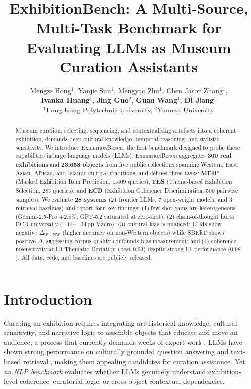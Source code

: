 \documentclass[11pt]{article}
\title{ExhibitionBench: A Multi-Source, Multi-Task Benchmark for\\
Evaluating LLMs as Museum Curation Assistants}
\author{Mengze Hong$^{1}$, Yanjie Sun$^{1}$, Mengyao Zhu$^{1}$, Chen Jason Zhang$^{1}$, \\ \textbf{Ivanka Huang}$^{1}$, \textbf{Jing Guo}$^{2}$, \textbf{Guan Wang}$^{1}$, \textbf{Di Jiang}$^{1}$\\ 
$^{1}$Hong Kong Polytechnic University, $^{2}$Yunnan University\\
}
\newcommand{\bench}{\textsc{ExhibitionBench}}
\newcommand{\meip}{\textsc{MEIP}}
\newcommand{\tes}{\textsc{TES}}
\newcommand{\ecd}{\textsc{ECD}}
\begin{document}
\maketitle

\begin{abstract}
Museum curation, selecting, sequencing, and contextualising artefacts
into a coherent exhibition, demands deep cultural knowledge, temporal
reasoning, and stylistic sensitivity.
We introduce \bench{}, the first benchmark designed to probe these
capabilities in large language models (LLMs).
\bench{} aggregates \textbf{300 real exhibitions} and \textbf{23{,}658 objects}
from five public collections spanning Western, East Asian, African,
and Islamic cultural traditions, and defines three tasks:
\textbf{\meip{}} (Masked Exhibition Item Prediction, 1{,}409 queries),
\textbf{\tes{}} (Theme-based Exhibition Selection, 283 queries),
and \textbf{\ecd{}} (Exhibition Coherence Discrimination, 500 pairwise samples).
We evaluate \textbf{28 systems} (21 frontier LLMs, 7 open-weight models, and 3 retrieval baselines) and report four key findings:
(1) few-shot gains are heterogeneous (Gemini-2.5-Pro $+2.5\%$; GPT-5.2 saturated at zero-shot);
(2) chain-of-thought hurts ECD universally ($-14$--$-34$\,pp Macro);
(3) cultural bias is nuanced: LLMs show negative $\Delta_{\mathrm{W{-}NW}}$ (higher accuracy on non-Western objects) while SBERT shows positive $\Delta$, suggesting corpus quality confounds bias measurement; and
(4) coherence insensitivity at L3 Thematic Deviation (best $0.63$) despite strong L1 performance ($0.98$).
All data, code, and baselines are publicly released.
\end{abstract}

\section{Introduction}
\label{sec:intro}

Curating an exhibition requires integrating art-historical knowledge,
cultural sensitivity, and narrative logic to assemble objects that
educate and move an audience, a process that currently demands weeks
of expert work \citep{macdonald2011companion}.
LLMs have shown strong performance on culturally grounded question
answering \citep{hendrycks2020mmlu} and text-based retrieval
\citep{nogueira2019passage}, making them appealing candidates for
curation assistance.
Yet \emph{no NLP benchmark} evaluates whether LLMs genuinely understand
exhibition-level coherence, curatorial logic, or cross-object contextual
dependencies.
\end{document}
